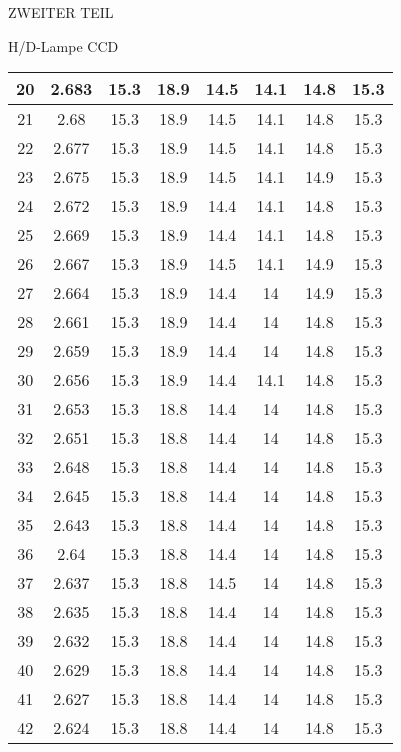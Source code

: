 \begin{appendix}
\begin{chapter}{ZWEITER TEIL}
\begin{section}{H/D-Lampe CCD}
\begin{scriptsize}
\begin{longtable}[htbp]{|c|c|c|c|c|c|c|c|}
            20 & 2.683 & 15.3 & 18.9 & 14.5 & 14.1 & 14.8 & 15.3 \\ \hline
            21 & 2.68 & 15.3 & 18.9 & 14.5 & 14.1 & 14.8 & 15.3 \\ \hline
            22 & 2.677 & 15.3 & 18.9 & 14.5 & 14.1 & 14.8 & 15.3 \\ \hline
            23 & 2.675 & 15.3 & 18.9 & 14.5 & 14.1 & 14.9 & 15.3 \\ \hline
            24 & 2.672 & 15.3 & 18.9 & 14.4 & 14.1 & 14.8 & 15.3 \\ \hline
            25 & 2.669 & 15.3 & 18.9 & 14.4 & 14.1 & 14.8 & 15.3 \\ \hline
            26 & 2.667 & 15.3 & 18.9 & 14.5 & 14.1 & 14.9 & 15.3 \\ \hline
            27 & 2.664 & 15.3 & 18.9 & 14.4 & 14 & 14.9 & 15.3 \\ \hline
            28 & 2.661 & 15.3 & 18.9 & 14.4 & 14 & 14.8 & 15.3 \\ \hline
            29 & 2.659 & 15.3 & 18.9 & 14.4 & 14 & 14.8 & 15.3 \\ \hline
            30 & 2.656 & 15.3 & 18.9 & 14.4 & 14.1 & 14.8 & 15.3 \\ \hline
            31 & 2.653 & 15.3 & 18.8 & 14.4 & 14 & 14.8 & 15.3 \\ \hline
            32 & 2.651 & 15.3 & 18.8 & 14.4 & 14 & 14.8 & 15.3 \\ \hline
            33 & 2.648 & 15.3 & 18.8 & 14.4 & 14 & 14.8 & 15.3 \\ \hline
            34 & 2.645 & 15.3 & 18.8 & 14.4 & 14 & 14.8 & 15.3 \\ \hline
            35 & 2.643 & 15.3 & 18.8 & 14.4 & 14 & 14.8 & 15.3 \\ \hline
            36 & 2.64 & 15.3 & 18.8 & 14.4 & 14 & 14.8 & 15.3 \\ \hline
            37 & 2.637 & 15.3 & 18.8 & 14.5 & 14 & 14.8 & 15.3 \\ \hline
            38 & 2.635 & 15.3 & 18.8 & 14.4 & 14 & 14.8 & 15.3 \\ \hline
            39 & 2.632 & 15.3 & 18.8 & 14.4 & 14 & 14.8 & 15.3 \\ \hline
            40 & 2.629 & 15.3 & 18.8 & 14.4 & 14 & 14.8 & 15.3 \\ \hline
            41 & 2.627 & 15.3 & 18.8 & 14.4 & 14 & 14.8 & 15.3 \\ \hline
            42 & 2.624 & 15.3 & 18.8 & 14.4 & 14 & 14.8 & 15.3 \\ \hline

\end{longtable}
\end{scriptsize}
\end{section}
\end{chapter}
\end{appendix}
